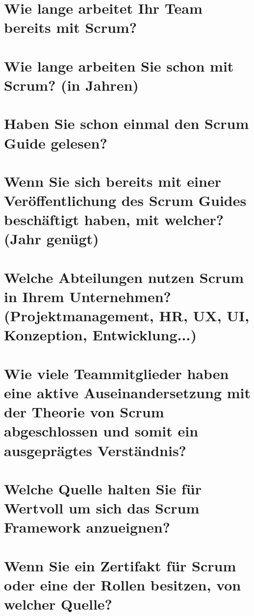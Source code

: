 \section*{Wie lange arbeitet Ihr Team bereits mit Scrum?}

\section*{Wie lange arbeiten Sie schon mit Scrum? (in Jahren)}
\kurzantwort

\section*{Haben Sie schon einmal den Scrum Guide gelesen?}

\section*{Wenn Sie sich bereits mit einer Veröffentlichung des Scrum Guides beschäftigt haben, mit welcher? (Jahr genügt)}
\kurzantwort

\section*{Welche Abteilungen nutzen Scrum in Ihrem Unternehmen? (Projektmanagement, HR, UX, UI, Konzeption, Entwicklung...)}
\langantwort

\section*{Wie viele Teammitglieder haben eine aktive Auseinandersetzung mit der Theorie von Scrum abgeschlossen und somit ein ausgeprägtes Verständnis?}
\kurzantwort

\section*{Welche Quelle halten Sie für Wertvoll um sich das Scrum Framework anzueignen?}
\langantwort

\section*{Wenn Sie ein Zertifakt für Scrum oder eine der Rollen besitzen, von welcher Quelle?}
\kurzantwort

